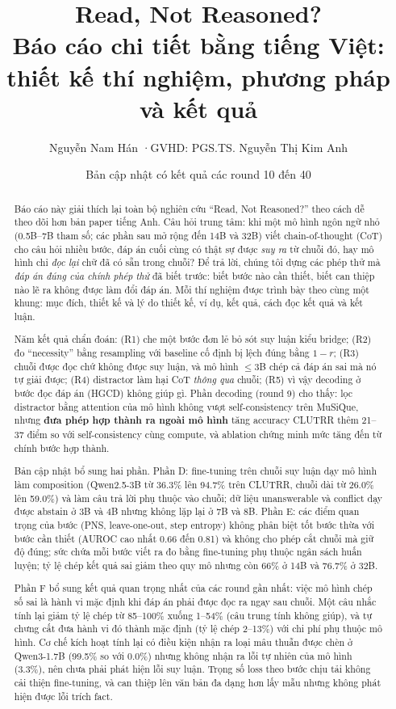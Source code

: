 \documentclass[11pt]{article}
\title{\textbf{Read, Not Reasoned?}\\[4pt]
\large Báo cáo chi tiết bằng tiếng Việt: thiết kế thí nghiệm, phương pháp và kết quả}
\author{Nguyễn Nam Hán \quad·\quad GVHD: PGS.TS. Nguyễn Thị Kim Anh}
\date{Bản cập nhật có kết quả các round 10 đến 40}
\begin{document}
\maketitle

\begin{abstract}
Báo cáo này giải thích lại toàn bộ nghiên cứu ``Read, Not Reasoned?'' theo cách dễ theo dõi hơn
bản paper tiếng Anh. Câu hỏi trung tâm: khi một mô hình ngôn ngữ nhỏ (0.5B--7B tham số; các phần sau mở rộng đến 14B và 32B) viết
chain-of-thought (CoT) cho câu hỏi nhiều bước, đáp án cuối cùng có thật sự được \emph{suy ra} từ
chuỗi đó, hay mô hình chỉ \emph{đọc lại} chữ đã có sẵn trong chuỗi? Để trả lời, chúng tôi dựng
các phép thử mà \emph{đáp án đúng của chính phép thử} đã biết trước: biết bước nào cần thiết, biết
can thiệp nào lẽ ra không được làm đổi đáp án. Mỗi thí nghiệm được trình bày theo cùng một khung:
mục đích, thiết kế và lý do thiết kế, ví dụ, kết quả, cách đọc kết quả và kết luận.

Năm kết quả chẩn đoán: (R1) che một bước đơn lẻ bỏ sót suy luận kiểu bridge; (R2) đo
``necessity'' bằng resampling với baseline cố định bị lệch đúng bằng $1-r$; (R3) chuỗi được đọc
chứ không được suy luận, và mô hình $\le$3B chép cả đáp án sai mà nó tự giải được; (R4) distractor
làm hại CoT \emph{thông qua} chuỗi; (R5) vì vậy decoding ở bước đọc đáp án (HGCD) không giúp gì.
Phần decoding (round 9) cho thấy: lọc distractor bằng attention của mô hình không vượt
self-consistency trên MuSiQue, nhưng \textbf{đưa phép hợp thành ra ngoài mô hình} tăng accuracy
CLUTRR thêm 21--37 điểm so với self-consistency cùng compute, và ablation chứng minh mức tăng đến
từ chính bước hợp thành.

Bản cập nhật bổ sung hai phần. Phần D: fine-tuning trên chuỗi suy luận dạy mô hình làm composition
(Qwen2.5-3B từ 36.3\% lên 94.7\% trên CLUTRR, chuỗi dài từ 26.0\% lên 59.0\%) và làm câu trả lời phụ thuộc
vào chuỗi; dữ liệu unanswerable và conflict dạy được abstain ở 3B và 4B nhưng không lặp lại ở 7B và 8B.
Phần E: các điểm quan trọng của bước (PNS, leave-one-out, step entropy) không phân biệt tốt bước thừa với
bước cần thiết (AUROC cao nhất 0.66 đến 0.81) và không cho phép cắt chuỗi mà giữ độ đúng; sức chứa mỗi bước
viết ra đo bằng fine-tuning phụ thuộc ngân sách huấn luyện; tỷ lệ chép kết quả sai giảm theo quy mô nhưng
còn 66\% ở 14B và 76.7\% ở 32B.

Phần F bổ sung kết quả quan trọng nhất của các round gần nhất: việc mô hình chép số sai là hành vi
mặc định khi đáp án phải được đọc ra ngay sau chuỗi. Một câu nhắc tính lại giảm tỷ lệ chép từ
85--100\% xuống 1--54\% (câu trung tính không giúp), và tự chưng cất đưa hành vi đó thành mặc định
(tỷ lệ chép 2--13\%) với chi phí phụ thuộc mô hình. Cơ chế kích hoạt tính lại có điều kiện nhận ra
loại mâu thuẫn được chèn ở Qwen3-1.7B (99.5\% so với 0.0\%) nhưng không nhận ra lỗi tự nhiên của mô
hình (3.3\%), nên chưa phải phát hiện lỗi suy luận. Trọng số loss theo bước chịu tải không cải thiện
fine-tuning, và can thiệp lên văn bản đa dạng hơn lấy mẫu nhưng không phát hiện được lỗi trích fact.
\end{abstract}
\end{document}
